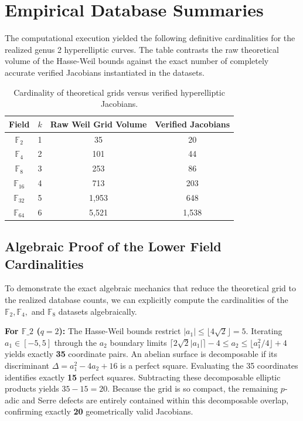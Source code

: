 \documentclass[12pt]{article}
\begin{document}
\section{Empirical Database Summaries}
The computational execution yielded the following definitive cardinalities for the realized genus 2 hyperelliptic curves. The table contrasts the raw theoretical volume of the Hasse-Weil bounds against the exact number of completely accurate verified Jacobians instantiated in the datasets.

\begin{table}[h!]
\centering
\begin{tabular}{cccc}
\toprule
Field & $k$ & Raw Weil Grid Volume & Verified Jacobians \\
\midrule
$\mathbb{F}_2$ & 1 & 35 & 20 \\
$\mathbb{F}_4$ & 2 & 101 & 44 \\
$\mathbb{F}_8$ & 3 & 253 & 86 \\
$\mathbb{F}_{16}$ & 4 & 713 & 203 \\
$\mathbb{F}_{32}$ & 5 & 1,953 & 648 \\
$\mathbb{F}_{64}$ & 6 & 5,521 & 1,538 \\
\bottomrule
\end{tabular}
\caption{Cardinality of theoretical grids versus verified hyperelliptic Jacobians.}
\end{table}

\subsection{Algebraic Proof of the Lower Field Cardinalities}
To demonstrate the exact algebraic mechanics that reduce the theoretical grid to the realized database counts, we can explicitly compute the cardinalities of the $\mathbb{F}_2, \mathbb{F}_4,$ and $\mathbb{F}_8$ datasets algebraically.

\textbf{For $\mathbb{F}\_2$ ($q=2$):}
The Hasse-Weil bounds restrict $\vert{}a_1\vert{} \le \lfloor 4\sqrt{2} \rfloor = 5$. Iterating $a_1 \in [-5, 5]$ through the $a_2$ boundary limits $\lceil 2\sqrt{2}\vert{}a_1\vert{} \rceil - 4 \le a_2 \le \lfloor a_1^2/4 \rfloor + 4$ yields exactly \textbf{35} coordinate pairs. 
An abelian surface is decomposable if its discriminant $\Delta = a_1^2 - 4a_2 + 16$ is a perfect square. Evaluating the 35 coordinates identifies exactly \textbf{15} perfect squares. Subtracting these decomposable elliptic products yields $35 - 15 = 20$. Because the grid is so compact, the remaining $p$-adic and Serre defects are entirely contained within this decomposable overlap, confirming exactly \textbf{20} geometrically valid Jacobians.
\end{document}
